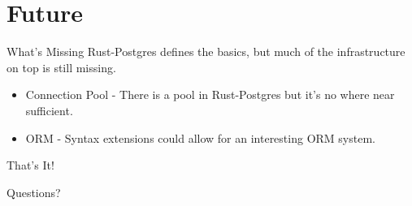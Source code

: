 \documentclass{beamer}
\begin{document}
\section{Future}

\begin{frame}{What's Missing}
    Rust-Postgres defines the basics, but much of the infrastructure on top
    is still missing.
    \begin{itemize}
        \item Connection Pool - There is a pool in Rust-Postgres but it's no
        where near sufficient.
        \item ORM - Syntax extensions could allow for an interesting ORM system.
    \end{itemize}
\end{frame}

\begin{frame}{That's It!}
    \begin{center}
        Questions?
    \end{center}
\end{frame}
\end{document}
